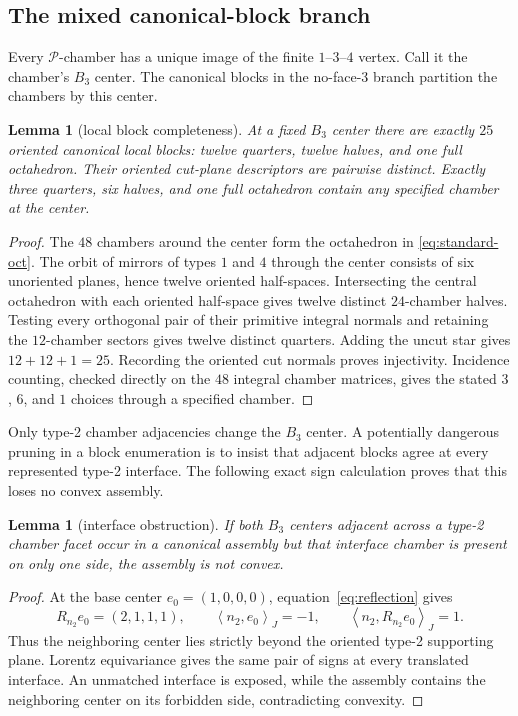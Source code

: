 \documentclass[11pt]{article}
\newtheorem{lemma}[theorem]{Lemma}
\theoremstyle{remark}
\newcommand{\PP}{\mathcal P}
\newcommand{\inner}[2]{\left\langle #1,#2\right\rangle_J}
\begin{document}
\subsection{The mixed canonical-block branch}

Every $\PP$-chamber has a unique image of the finite $1$--$3$--$4$ vertex.
Call it the chamber's $B_3$ center.  The canonical blocks in the no-face-3
branch partition the chambers by this center.

\begin{lemma}[local block completeness]\label{lem:local}
At a fixed $B_3$ center there are exactly $25$ oriented canonical local
blocks: twelve quarters, twelve halves, and one full octahedron.  Their
oriented cut-plane descriptors are pairwise distinct.  Exactly three
quarters, six halves, and one full octahedron contain any specified chamber
at the center.
\end{lemma}

\begin{proof}
The $48$ chambers around the center form the octahedron in
\eqref{eq:standard-oct}.  The orbit of mirrors of types $1$ and $4$ through
the center consists of six unoriented planes, hence twelve oriented
half-spaces.  Intersecting the central octahedron with each oriented
half-space gives twelve distinct $24$-chamber halves.  Testing every
orthogonal pair of their primitive integral normals and retaining the
$12$-chamber sectors gives twelve distinct quarters.  Adding the uncut star
gives $12+12+1=25$.  Recording the oriented cut normals proves injectivity.
Incidence counting, checked directly on the $48$ integral chamber matrices,
gives the stated $3$, $6$, and $1$ choices through a specified chamber.
\end{proof}

Only type-2 chamber adjacencies change the $B_3$ center.  A potentially
dangerous pruning in a block enumeration is to insist that adjacent blocks
agree at every represented type-2 interface.  The following exact sign
calculation proves that this loses no convex assembly.

\begin{lemma}[interface obstruction]\label{lem:interface}
If both $B_3$ centers adjacent across a type-2 chamber facet occur in a
canonical assembly but that interface chamber is present on only one side,
the assembly is not convex.
\end{lemma}

\begin{proof}
At the base center $e_0=(1,0,0,0)$, equation~\eqref{eq:reflection} gives
\[
 R_{n_2}e_0=(2,1,1,1),\qquad
 \inner{n_2}{e_0}=-1,\qquad
 \inner{n_2}{R_{n_2}e_0}=1.
\]
Thus the neighboring center lies strictly beyond the oriented type-2
supporting plane.  Lorentz equivariance gives the same pair of signs at
every translated interface.  An unmatched interface is exposed, while the
assembly contains the neighboring center on its forbidden side, contradicting
convexity.
\end{proof}
\end{document}

